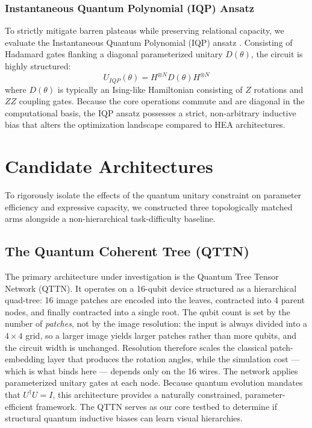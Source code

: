 \documentclass[12pt, a4paper, oneside]{report}
\begin{document}
\subsubsection{Instantaneous Quantum Polynomial (IQP) Ansatz}
To strictly mitigate barren plateaus while preserving relational capacity, we evaluate the Instantaneous Quantum Polynomial (IQP) ansatz \cite{iqp_ansatz, havlicek2019}. Consisting of Hadamard gates flanking a diagonal parameterized unitary $D(\theta)$, the circuit is highly structured:
\begin{equation}
    U_{IQP}(\theta) = H^{\otimes N} D(\theta) H^{\otimes N}
\end{equation}
where $D(\theta)$ is typically an Ising-like Hamiltonian consisting of $Z$ rotations and $ZZ$ coupling gates. Because the core operations commute and are diagonal in the computational basis, the IQP ansatz possesses a strict, non-arbitrary inductive bias that alters the optimization landscape compared to HEA architectures.


\section{Candidate Architectures}
To rigorously isolate the effects of the quantum unitary constraint on parameter efficiency and expressive capacity, we constructed three topologically matched arms alongside a non-hierarchical task-difficulty baseline.

\subsection{The Quantum Coherent Tree (QTTN)}
The primary architecture under investigation is the Quantum Tree Tensor Network (QTTN). It operates on a 16-qubit device structured as a hierarchical quad-tree: 16 image patches are encoded into the leaves, contracted into 4 parent nodes, and finally contracted into a single root. The qubit count is set by the number of \textit{patches}, not by the image resolution: the input is always divided into a $4 \times 4$ grid, so a larger image yields larger patches rather than more qubits, and the circuit width is unchanged. Resolution therefore scales the classical patch-embedding layer that produces the rotation angles, while the simulation cost --- which is what binds here --- depends only on the 16 wires. The network applies parameterized unitary gates at each node. Because quantum evolution mandates that $U^\dagger U = I$, this architecture provides a naturally constrained, parameter-efficient framework. The QTTN serves as our core testbed to determine if structural quantum inductive biases can learn visual hierarchies.
\end{document}

